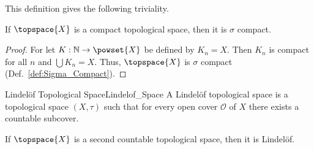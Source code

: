 \documentclass{article}                                                        %
\begin{document}
        This definition gives the following triviality.
        \begin{theorem}
            \label{thm:Compact_Implies_Sigma_Compact}%
            If $\topspace{X}$ is a compact topological space, then it is
            $\sigma$ compact.
        \end{theorem}
        \begin{proof}
            For let $K:\mathbb{N}\rightarrow\powset{X}$ be defined by
            $K_{n}=X$. Then $K_{n}$ is compact for all $n$ and
            $\bigcup{K}_{n}=X$. Thus, $\topspace{X}$ is $\sigma$ compact
            (Def.~\ref{def:Sigma_Compact}).
        \end{proof}
        \begin{fdefinition}{Lindel\"{o}f Topological Space}{Lindelof_Space}
            A Lindel\"{o}f topological space is a topological space $(X,\tau)$
            such that for every open cover $\mathcal{O}$ of $X$ there exists a
            countable subcover.
        \end{fdefinition}
        \begin{theorem}
            \label{thm:Second_Countable_Implies_Lindelof}%
            If $\topspace{X}$ is a second countable topological space, then it
            is Lindel\"{o}f.
        \end{theorem}
\end{document}
